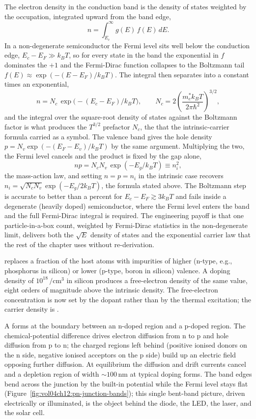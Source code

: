 

The electron density in the conduction band is the density of states
weighted by the occupation, integrated upward from the band edge,
\[
n = \int_{E_c}^{\infty} g(E)\,f(E)\,dE.
\]
In a non-degenerate semiconductor the Fermi level sits well below the
conduction edge, $E_c - E_F \gg k_B T$, so for every state in the band
the exponential in $f$ dominates the $+1$ and the Fermi-Dirac function
collapses to the Boltzmann tail $f(E) \approx \exp(-(E - E_F)/k_B T)$.
The integral then separates into a constant times an exponential,
\[
n = N_c\,\exp\!\big(-(E_c - E_F)/k_B T\big),
\qquad
N_c = 2\left(\frac{m^{*}_e k_B T}{2\pi\hbar^{2}}\right)^{3/2},
\]
and the integral over the square-root density of states against the
Boltzmann factor is what produces the $T^{3/2}$ prefactor $N_c$, the
 that the intrinsic-carrier formula
carried as a symbol. The valence band gives the hole density $p = N_v
\exp(-(E_F - E_v)/k_B T)$ by the same argument. Multiplying the two,
the Fermi level cancels and the product is fixed by the gap alone,
\[
np = N_c N_v\,\exp(-E_g/k_B T) \equiv n_i^{2},
\]
the mass-action law, and setting $n = p = n_i$ in the intrinsic case
recovers $n_i = \sqrt{N_c N_v}\exp(-E_g/2k_B T)$, the formula stated
above. The Boltzmann step is accurate to better than a percent for
$E_c - E_F \gtrsim 3k_B T$ and fails inside a degenerate (heavily doped)
semiconductor, where the Fermi level enters the band and the full
Fermi-Dirac integral is required. The engineering payoff is that one
particle-in-a-box count, weighted by Fermi-Dirac statistics in the
non-degenerate limit, delivers both the $\sqrt{E}$ density of states and
the exponential carrier law that the rest of the chapter uses without
re-derivation.

 replaces a fraction of the host atoms with impurities
of higher (n-type, e.g., phosphorus in silicon) or lower (p-type,
boron in silicon) valence. A doping density of $10^{18}\,\si{\per
\centi\meter\cubed}$ in silicon produces a free-electron density of
the same value, eight orders of magnitude above the intrinsic
density. The free-electron concentration is now set by the dopant
rather than by the thermal excitation; the carrier density is
.

A  forms at the boundary between an n-doped
region and a p-doped region. The chemical-potential difference drives
electron diffusion from n to p and hole diffusion from p to n; the
charged regions left behind (positive ionised donors on the n side,
negative ionised acceptors on the p side) build up an electric field
opposing further diffusion. At equilibrium the diffusion and drift
currents cancel and a depletion region of width $\sim 100\,\si{\nano
\meter}$ at typical doping forms. The band edges bend across the
junction by the built-in potential while the Fermi level stays flat
(Figure~\ref{fig:vol04ch12:pn-junction-bands}); this single bent-band
picture, driven electrically or illuminated, is the object behind the
diode, the LED, the laser, and the solar cell.

